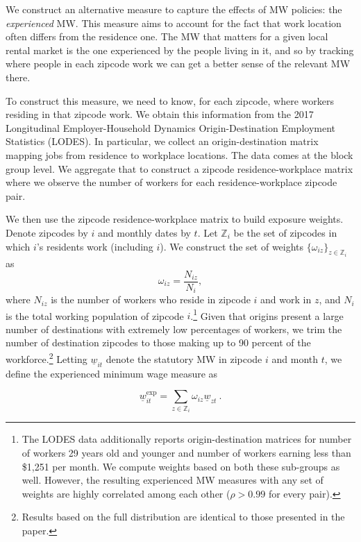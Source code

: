 We construct an alternative measure to capture the effects of MW policies: the 
\textit{experienced} MW. This measure aims to account for the fact that work 
location often differs from the residence one. The MW that matters for a given local rental market 
is the one experienced by the people living in it, and so by tracking where people in 
each zipcode work we can get a better sense of the relevant MW there.

To construct this measure, we need to know, for each zipcode, where workers residing in that 
zipcode work. We obtain this information from the 2017 Longitudinal Employer-Household 
Dynamics Origin-Destination Employment Statistics (LODES). In particular, we collect an origin-destination matrix mapping jobs from residence to workplace locations. The data 
comes at the block group level. We aggregate that to construct a zipcode residence-workplace 
matrix where we observe the number of workers for each residence-workplace zipcode pair.

We then use the zipcode residence-workplace matrix to build exposure weights. Denote 
zipcodes by $i$ and monthly dates by $t$. Let $\mathds{Z}_i$ be the set of zipcodes in 
which $i$'s residents work (including $i$). We construct the set of weights 
$\{\omega_{iz}\}_{z \in \mathds{Z}_i}$ as $$\omega_{iz} = \frac{N_{iz}}{N_i} , $$ where 
$N_{iz}$ is the number of workers who reside in zipcode $i$ and work in $z$, and $N_i$ 
is the total working population of zipcode $i$.\footnote{The LODES data additionally 
	reports origin-destination matrices for number of workers 29 years old and younger  
	and number of workers earning less than \$1,251 per month. We compute weights based 
	on both these sub-groups as well. However, the resulting experienced MW measures with
	any set of weights are highly correlated among each other ($\rho>0.99$ for every pair).} 
Given that origins present a large number of destinations with extremely low percentages of 
workers, we trim the number of destination zipcodes to those making up to 90 percent of the 
workforce.\footnote{Results based on the full distribution are identical to those presented
	in the paper.} 
Letting $\underline{w}_{it}$ denote the statutory MW in zipcode $i$ and month $t$, we 
define the experienced minimum wage measure as

\begin{equation}
	\underline{w}^{\text{exp}}_{it} = 
			\sum_{z \in \mathds{Z}_i} \omega_{iz} \underline{w}_{zt} \ . 
\end{equation}

